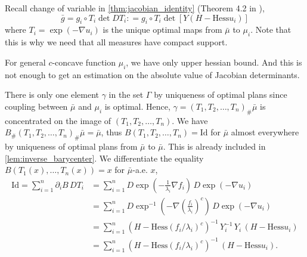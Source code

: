 Recall change of variable in \cref{thm:jacobian_identity} (Theorem 4.2 in \cite{cordero2001riemannian}),
\[
	\bar{g} = g_i \circ T_i \det D T_i :
	= g_i \circ T_i \det[Y(H-\text{Hess} u_i)]
\]
where $T_i = \exp(-\nabla u_i)$ is the unique optimal maps from $\bar{\mu}$ to $\mu_i$.
Note that this is why we need that all measures have compact support.

For general $c$-concave function $\mu_i$, we have only upper hessian bound.
And this is not enough to get an estimation on the absolute value of Jacobian determinants.


There is only one element $\gamma$ in the set $\Gamma$ by uniqueness of optimal plans
since coupling between $\bar{\mu}$ and $\mu_i$ is optimal.
Hence, $\gamma = (T_1, T_2, \ldots, T_n)_{\#}\bar{\mu}$
	is concentrated on the image of $(T_1, T_2, \ldots, T_n)$.
We have $B_{\#}(T_1, T_2, \ldots, T_n)_{\#}\bar{\mu}=\bar{\mu}$,
thus $B(T_1, T_2, \ldots, T_n) = \text{Id}$ for $\bar{\mu}$ almost everywhere
by uniqueness of optimal plans from $\bar{\mu}$ to $\bar{\mu}$.
This is already included in \cref{lem:inverse_barycenter}.
We differentiate the equality $B(T_1(x), \ldots, T_n(x))=x$ for $\bar{\mu}$-a.e. $x$,
\begin{align*}
	\text{Id} =\sum_{i=1}^n \partial_i B\, DT_i
	 & =\sum_{i=1}^n D \exp(-\frac{1}{\lambda_i}\nabla f_i) \, D \exp(-\nabla u_i)                     \\
	 & =\sum_{i=1}^n D \exp^{-1}(-\nabla \left( \frac{f_i}{\lambda_i}\right)^c) \, D \exp(-\nabla u_i) \\
	 & =\sum_{i=1}^n(H-\text{Hess}(f_i / \lambda_i)^c)^{-1}\,Y_i^{-1}\,
	Y_i\,(H-\text{Hess} u_i)                                                                           \\
	 & =\sum_{i=1}^n(H-\text{Hess}(f_i / \lambda_i)^c)^{-1}\,
	(H-\text{Hess}u_i) .
\end{align*}

